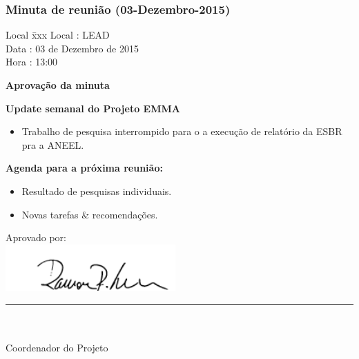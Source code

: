 \subsubsection{Minuta de reunião (03-Dezembro-2015)}

\begin{tabbing}
  Local \= xxx \kill
  Local \> : LEAD \\
  Data  \> : 03 de Dezembro de 2015 \\
  Hora  \> : 13:00
\end{tabbing} 


\textbf{Aprovação da minuta}

\textbf{Update semanal do Projeto EMMA}
   									
						
	\begin{itemize}
			\item Trabalho de pesquisa interrompido para o a execução de relatório da
			ESBR pra a ANEEL.
			\end{itemize}
		
					
			

\textbf{Agenda para a próxima reunião:}
  \begin{itemize}
    \item Resultado de pesquisas individuais.
    \item Novas tarefas \& recomendações.
  \end{itemize}


\vspace{5mm}%
\parbox[t]{70mm}{
  Aprovado por: \\[5mm]
  \centering
  \includegraphics[width=65mm]{figs/logo/assinatura-ramon.png} \\[-4mm]
  \rule[2mm]{70mm}{0.1mm} \\
  \ramon \\[1mm]
  Coordenador do Projeto \\
}

\fim